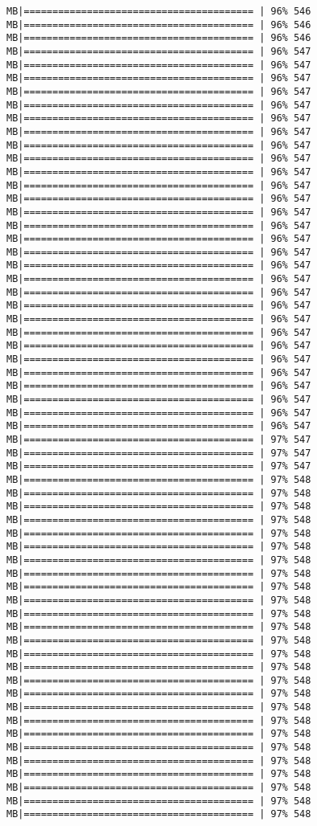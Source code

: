 \documentclass[
]{article}
\begin{document}
\begin{verbatim}
MB|======================================== | 96% 546 MB|======================================== | 96% 546 MB|======================================== | 96% 546 MB|======================================== | 96% 547 MB|======================================== | 96% 547 MB|======================================== | 96% 547 MB|======================================== | 96% 547 MB|======================================== | 96% 547 MB|======================================== | 96% 547 MB|======================================== | 96% 547 MB|======================================== | 96% 547 MB|======================================== | 96% 547 MB|======================================== | 96% 547 MB|======================================== | 96% 547 MB|======================================== | 96% 547 MB|======================================== | 96% 547 MB|======================================== | 96% 547 MB|======================================== | 96% 547 MB|======================================== | 96% 547 MB|======================================== | 96% 547 MB|======================================== | 96% 547 MB|======================================== | 96% 547 MB|======================================== | 96% 547 MB|======================================== | 96% 547 MB|======================================== | 96% 547 MB|======================================== | 96% 547 MB|======================================== | 96% 547 MB|======================================== | 96% 547 MB|======================================== | 96% 547 MB|======================================== | 96% 547 MB|======================================== | 96% 547 MB|======================================== | 96% 547 MB|======================================== | 97% 547 MB|======================================== | 97% 547 MB|======================================== | 97% 547 MB|======================================== | 97% 548 MB|======================================== | 97% 548 MB|======================================== | 97% 548 MB|======================================== | 97% 548 MB|======================================== | 97% 548 MB|======================================== | 97% 548 MB|======================================== | 97% 548 MB|======================================== | 97% 548 MB|======================================== | 97% 548 MB|======================================== | 97% 548 MB|======================================== | 97% 548 MB|======================================== | 97% 548 MB|======================================== | 97% 548 MB|======================================== | 97% 548 MB|======================================== | 97% 548 MB|======================================== | 97% 548 MB|======================================== | 97% 548 MB|======================================== | 97% 548 MB|======================================== | 97% 548 MB|======================================== | 97% 548 MB|======================================== | 97% 548 MB|======================================== | 97% 548 MB|======================================== | 97% 548 MB|======================================== | 97% 548 MB|======================================== | 97% 548 MB|======================================== | 97% 548 
\end{verbatim}
\end{document}
